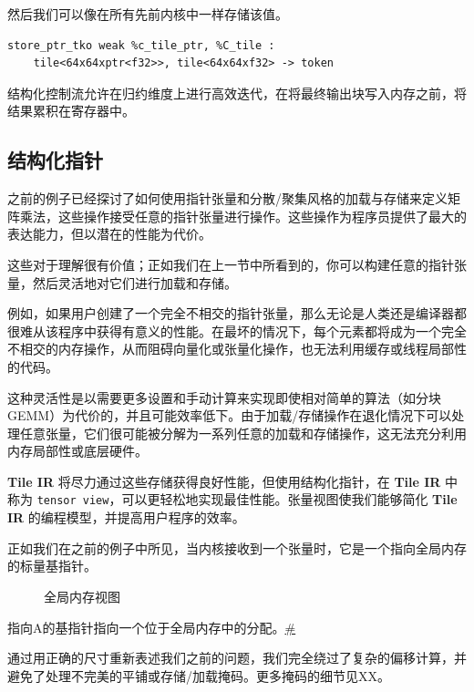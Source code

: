 \documentclass{article}
\begin{document}
然后我们可以像在所有先前内核中一样存储该值。


\begin{lstlisting}
store_ptr_tko weak %c_tile_ptr, %C_tile :
    tile<64x64xptr<f32>>, tile<64x64xf32> -> token
\end{lstlisting}

结构化控制流允许在归约维度上进行高效迭代，在将最终输出块写入内存之前，将结果累积在寄存器中。



\subsection{结构化指针}

之前的例子已经探讨了如何使用指针张量和分散/聚集风格的加载与存储来定义矩阵乘法，这些操作接受任意的指针张量进行操作。这些操作为程序员提供了最大的表达能力，但以潜在的性能为代价。


这些对于理解很有价值；正如我们在上一节中所看到的，你可以构建任意的指针张量，然后灵活地对它们进行加载和存储。


例如，如果用户创建了一个完全不相交的指针张量，那么无论是人类还是编译器都很难从该程序中获得有意义的性能。在最坏的情况下，每个元素都将成为一个完全不相交的内存操作，从而阻碍向量化或张量化操作，也无法利用缓存或线程局部性的代码。


这种灵活性是以需要更多设置和手动计算来实现即使相对简单的算法（如分块GEMM）为代价的，并且可能效率低下。由于加载/存储操作在退化情况下可以处理任意张量，它们很可能被分解为一系列任意的加载和存储操作，这无法充分利用内存局部性或底层硬件。


\textbf{Tile IR} 将尽力通过这些存储获得良好性能，但使用结构化指针，在 \textbf{Tile IR} 中称为 \texttt{tensor view}，可以更轻松地实现最佳性能。张量视图使我们能够简化 \textbf{Tile IR} 的编程模型，并提高用户程序的效率。


正如我们在之前的例子中所见，当内核接收到一个张量时，它是一个指向全局内存的标量基指针。


\begin{figure}[!ht]\centering

\caption{全局内存视图}
\end{figure}
指向A的基指针指向一个位于全局内存中的分配。\href{https://docs.nvidia.com/cuda/tile-ir/latest/sections/prog_model.html#id1}{\#}



通过用正确的尺寸重新表述我们之前的问题，我们完全绕过了复杂的偏移计算，并避免了处理不完美的平铺或存储/加载掩码。更多掩码的细节见XX。
\end{document}
